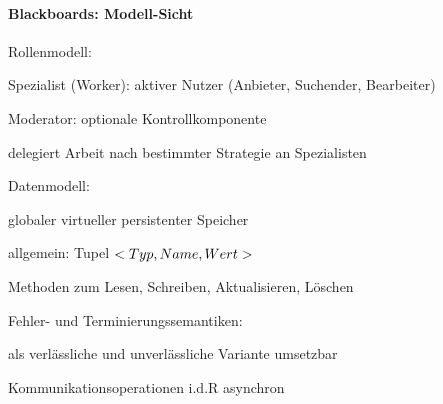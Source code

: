 \documentclass[10pt]{article}
\begin{document}
\paragraph{Blackboards: Modell-Sicht}
\begin{itemize*}
  \item Rollenmodell:
  \begin{itemize*}
    \item Spezialist (Worker): aktiver Nutzer (Anbieter, Suchender, Bearbeiter)
    \item Moderator: optionale Kontrollkomponente
    \begin{itemize*}
      \item delegiert Arbeit nach bestimmter Strategie an Spezialisten
      
    \end{itemize*}
  \end{itemize*}
  \item Datenmodell:
  \begin{itemize*}
    \item globaler virtueller persistenter Speicher
    \item allgemein: Tupel \textbf{$<Typ,\space Name, \space Wert>$}
    \item Methoden zum Lesen, Schreiben, Aktualisieren, Löschen
  \end{itemize*}
  \item Fehler- und Terminierungssemantiken:
  \begin{itemize*}
    \item als verlässliche und unverlässliche Variante umsetzbar
    \item Kommunikationsoperationen i.d.R asynchron
  \end{itemize*}
\end{itemize*}
\end{document}
